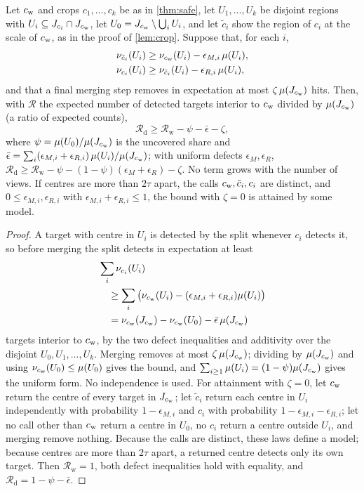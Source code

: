 \begin{theorem}
\label{thm:robust}
Let $c_{\mathrm{w}}$ and crops $c_1, \dots, c_k$ be as in \cref{thm:safe}, let $U_1, \dots, U_k$ be disjoint regions with $U_i \subseteq J_{c_i} \cap J_{c_{\mathrm{w}}}$, let $U_0 = J_{c_{\mathrm{w}}} \setminus \bigcup_i U_i$, and let $\tilde c_i$ show the region of $c_i$ at the scale of $c_{\mathrm{w}}$, as in the proof of \cref{lem:crop}. Suppose that, for each $i$,
\begin{align*}
\nu_{\tilde c_i}(U_i) &\ge \nu_{c_{\mathrm{w}}}(U_i) - \epsilon_{M,i}\,\mu(U_i),\\
\nu_{c_i}(U_i) &\ge \nu_{\tilde c_i}(U_i) - \epsilon_{R,i}\,\mu(U_i),
\end{align*}
and that a final merging step removes in expectation at most $\zeta\,\mu(J_{c_{\mathrm{w}}})$ hits. Then, with $\mathcal{R}$ the expected number of detected targets interior to $c_{\mathrm{w}}$ divided by $\mu(J_{c_{\mathrm{w}}})$ (a ratio of expected counts),
\[
\mathcal{R}_{\mathrm{d}} \ge \mathcal{R}_{\mathrm{w}} - \psi - \bar\epsilon - \zeta,
\]
where $\psi = \mu(U_0)/\mu(J_{c_{\mathrm{w}}})$ is the uncovered share and $\bar\epsilon = \sum_i (\epsilon_{M,i} + \epsilon_{R,i})\,\mu(U_i)/\mu(J_{c_{\mathrm{w}}})$; with uniform defects $\epsilon_M, \epsilon_R$, $\mathcal{R}_{\mathrm{d}} \ge \mathcal{R}_{\mathrm{w}} - \psi - (1-\psi)(\epsilon_M + \epsilon_R) - \zeta$. No term grows with the number of views. If centres are more than $2\tau$ apart, the calls $c_{\mathrm{w}}, \tilde c_i, c_i$ are distinct, and $0 \le \epsilon_{M,i}, \epsilon_{R,i}$ with $\epsilon_{M,i} + \epsilon_{R,i} \le 1$, the bound with $\zeta = 0$ is attained by some model.
\end{theorem}

\begin{proof}
A target with centre in $U_i$ is detected by the split whenever $c_i$ detects it, so before merging the split detects in expectation at least
\begin{align*}
&\sum_{i} \nu_{c_i}(U_i)\\
&\quad\ge \sum_i \big(\nu_{c_{\mathrm{w}}}(U_i) - (\epsilon_{M,i} + \epsilon_{R,i})\mu(U_i)\big)\\
&\quad= \nu_{c_{\mathrm{w}}}(J_{c_{\mathrm{w}}}) - \nu_{c_{\mathrm{w}}}(U_0) - \bar\epsilon\,\mu(J_{c_{\mathrm{w}}})
\end{align*}
targets interior to $c_{\mathrm{w}}$, by the two defect inequalities and additivity over the disjoint $U_0, U_1, \dots, U_k$. Merging removes at most $\zeta\,\mu(J_{c_{\mathrm{w}}})$; dividing by $\mu(J_{c_{\mathrm{w}}})$ and using $\nu_{c_{\mathrm{w}}}(U_0) \le \mu(U_0)$ gives the bound, and $\sum_{i \ge 1}\mu(U_i) = (1-\psi)\mu(J_{c_{\mathrm{w}}})$ gives the uniform form. No independence is used. For attainment with $\zeta = 0$, let $c_{\mathrm{w}}$ return the centre of every target in $J_{c_{\mathrm{w}}}$; let $\tilde c_i$ return each centre in $U_i$ independently with probability $1 - \epsilon_{M,i}$ and $c_i$ with probability $1 - \epsilon_{M,i} - \epsilon_{R,i}$; let no call other than $c_{\mathrm{w}}$ return a centre in $U_0$, no $c_i$ return a centre outside $U_i$, and merging remove nothing. Because the calls are distinct, these laws define a model; because centres are more than $2\tau$ apart, a returned centre detects only its own target. Then $\mathcal{R}_{\mathrm{w}} = 1$, both defect inequalities hold with equality, and $\mathcal{R}_{\mathrm{d}} = 1 - \psi - \bar\epsilon$.
\end{proof}

